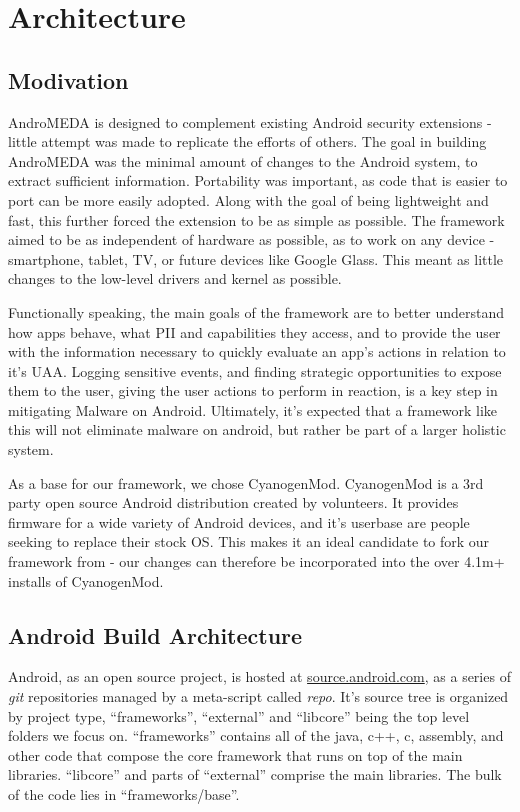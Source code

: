 \chapter{Architecture}
\label{sec:architecture}

\section{Modivation}
AndroMEDA is designed to complement existing Android security extensions - little attempt was made to replicate the efforts of others. The goal in building AndroMEDA was the minimal amount of changes to the Android system, to extract sufficient information. Portability was important, as code that is easier to port can be more easily adopted. Along with the goal of being lightweight and fast, this further forced the extension to be as simple as possible. The framework aimed to be as independent of hardware as possible, as to work on any device - smartphone, tablet, TV, or future devices like Google Glass. This meant as little changes to the low-level drivers and kernel as possible.

Functionally speaking, the main goals of the framework are to better understand how apps behave, what PII and capabilities they access, and to provide the user with the information necessary to quickly evaluate an app's actions in relation to it's UAA. Logging sensitive events, and finding strategic opportunities to expose them to the user, giving the user actions to perform in reaction, is a key step in mitigating Malware on Android. Ultimately, it's expected that a framework like this will not eliminate malware on android, but rather be part of a larger holistic system.

As a base for our framework, we chose CyanogenMod\citep{cyanogenmod}. CyanogenMod is a 3rd party open source Android distribution created by volunteers. It provides firmware for a wide variety of Android devices, and it's userbase are people seeking to replace their stock OS. This makes it an ideal candidate to fork our framework from - our changes can therefore be incorporated into the over 4.1m+ installs of CyanogenMod\citep{cyanogenmodstats}.

\section{Android Build Architecture}
Android, as an open source project, is hosted at \url{source.android.com}\citep{androidsource}, as a series of \textit{git} repositories managed by a meta-script called \textit{repo}. It's source tree is organized by project type, ``frameworks'', ``external'' and ``libcore'' being the top level folders we focus on. ``frameworks'' contains all of the java, c++, c, assembly, and other code that compose the core framework that runs on top of the main libraries. ``libcore'' and parts of ``external'' comprise the main libraries. The bulk of the code lies in ``frameworks/base''.

